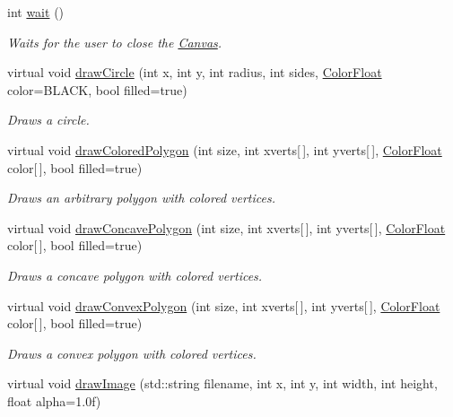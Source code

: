 \begin{DoxyCompactItemize}
int \hyperlink{classtsgl_1_1_canvas_a39e69fd4d1ad8cf0e22ecea12f1ddf08}{wait} ()
\begin{DoxyCompactList}\small\item\em Waits for the user to close the \hyperlink{classtsgl_1_1_canvas}{Canvas}. \end{DoxyCompactList}\item 
virtual void \hyperlink{classtsgl_1_1_canvas_a2162c16f6aeaee01f8e29696f5818c03}{draw\+Circle} (int x, int y, int radius, int sides, \hyperlink{structtsgl_1_1_color_float}{Color\+Float} color=B\+L\+A\+C\+K, bool filled=true)
\begin{DoxyCompactList}\small\item\em Draws a circle. \end{DoxyCompactList}\item 
virtual void \hyperlink{classtsgl_1_1_canvas_a2165615afc3cebfe38e4313c25bd17b9}{draw\+Colored\+Polygon} (int size, int xverts\mbox{[}$\,$\mbox{]}, int yverts\mbox{[}$\,$\mbox{]}, \hyperlink{structtsgl_1_1_color_float}{Color\+Float} color\mbox{[}$\,$\mbox{]}, bool filled=true)
\begin{DoxyCompactList}\small\item\em Draws an arbitrary polygon with colored vertices. \end{DoxyCompactList}\item 
virtual void \hyperlink{classtsgl_1_1_canvas_ad98cb8db661ef24279b61c4c11fd29ea}{draw\+Concave\+Polygon} (int size, int xverts\mbox{[}$\,$\mbox{]}, int yverts\mbox{[}$\,$\mbox{]}, \hyperlink{structtsgl_1_1_color_float}{Color\+Float} color\mbox{[}$\,$\mbox{]}, bool filled=true)
\begin{DoxyCompactList}\small\item\em Draws a concave polygon with colored vertices. \end{DoxyCompactList}\item 
virtual void \hyperlink{classtsgl_1_1_canvas_a9cb84248c3559c81e4cb2e0d194b2437}{draw\+Convex\+Polygon} (int size, int xverts\mbox{[}$\,$\mbox{]}, int yverts\mbox{[}$\,$\mbox{]}, \hyperlink{structtsgl_1_1_color_float}{Color\+Float} color\mbox{[}$\,$\mbox{]}, bool filled=true)
\begin{DoxyCompactList}\small\item\em Draws a convex polygon with colored vertices. \end{DoxyCompactList}\item 
virtual void \hyperlink{classtsgl_1_1_canvas_ae94a586629d20b7fabcb402d1c654628}{draw\+Image} (std\+::string filename, int x, int y, int width, int height, float alpha=1.\+0f)

\end{DoxyCompactItemize}
